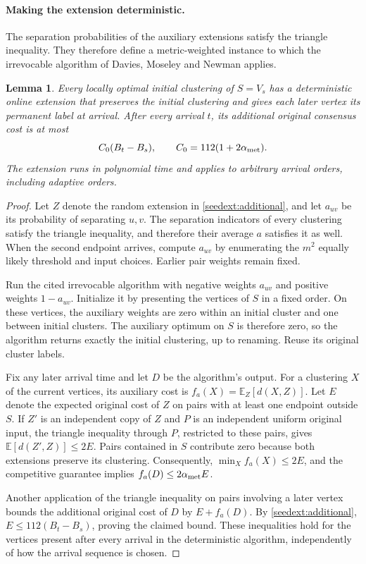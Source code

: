 \documentclass[11pt]{article}
\newtheorem{lemma}[theorem]{Lemma}
\begin{document}
\paragraph{Making the extension deterministic.}
The separation probabilities of the auxiliary extensions satisfy the
triangle inequality. They therefore define a metric-weighted instance
to which the irrevocable algorithm of Davies, Moseley and Newman
applies.

\begin{lemma}
\label{virt:lemma}
Every locally optimal initial clustering of $S=V_s$ has a deterministic
online extension that preserves the initial clustering and gives each
later vertex its permanent label at arrival. After every arrival $t$,
its additional original consensus cost is at most
\[
 C_0(B_t-B_s),\qquad C_0=112(1+2\alpha_{\rm met}).
\]
The extension runs in polynomial time and applies to arbitrary arrival
orders, including adaptive orders.
\end{lemma}
\begin{proof}
Let $Z$ denote the random extension in \cref{seedext:additional}, and
let $a_{uv}$ be its probability of separating $u,v$. The separation
indicators of every clustering satisfy the triangle inequality, and
therefore their average $a$ satisfies it as well. When the second
endpoint arrives, compute $a_{uv}$ by enumerating the $m^2$ equally
likely threshold and input choices. Earlier pair weights remain fixed.

Run the cited irrevocable algorithm with negative weights $a_{uv}$
and positive weights $1-a_{uv}$. Initialize it by presenting the
vertices of $S$ in a fixed order. On these vertices, the auxiliary
weights are zero within an initial cluster and one between initial
clusters. The auxiliary optimum on $S$ is therefore zero, so the
algorithm returns exactly the initial clustering, up to renaming.
Reuse its original cluster labels.

Fix any later arrival time and let $D$ be the algorithm's output.
For a clustering $X$ of the current vertices, its auxiliary cost is
$f_a(X)=\mathbb E_Z[d(X,Z)]$. Let $E$ denote the expected original
cost of $Z$ on pairs with at least one endpoint outside $S$. If $Z'$
is an independent copy of $Z$ and $P$ is an independent uniform
original input, the triangle inequality through $P$, restricted to
these pairs, gives $\mathbb E[d(Z',Z)]\le2E$. Pairs contained in $S$
contribute zero because both extensions preserve its clustering.
Consequently, $\min_X f_a(X)\le2E$, and the competitive guarantee
implies $f_a(D)\le2\alpha_{\rm met}E$.

Another application of the triangle inequality on pairs involving a
later vertex bounds the additional original cost of $D$ by
$E+f_a(D)$. By \cref{seedext:additional},
$E\le112(B_t-B_s)$, proving the claimed bound. These inequalities
hold for the vertices present after every arrival in the deterministic
algorithm, independently of how the arrival sequence is chosen.
\end{proof}
\end{document}
